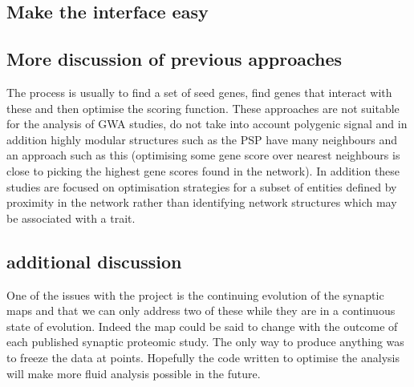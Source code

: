 \subsection{Make the interface easy}
\label{sec:discussion_make_easy}

\subsection{More discussion of previous approaches}
\label{sec:discussion more discussion of previous approaches}
The process is usually to find a set of seed genes, find genes that interact with these and then optimise the scoring function. These approaches are not suitable for the analysis of GWA studies, do not take into account polygenic signal and in addition highly modular structures such as the PSP have many neighbours and an approach such as this (optimising some gene score over nearest neighbours is close to picking the highest gene scores found in the network). In addition these studies are focused on optimisation strategies for a subset of entities defined by proximity in the network rather than identifying network structures which may be associated with a trait.




 	 
\subsection{additional discussion}

One of the issues with the project is the continuing evolution of the synaptic maps and that we can only address two of these while they are in a continuous state of evolution. Indeed the map could be said to change with the outcome of each published synaptic proteomic study. The only way to produce anything was to freeze the data at points. Hopefully the code written to optimise the analysis will make more fluid analysis possible in the future.



